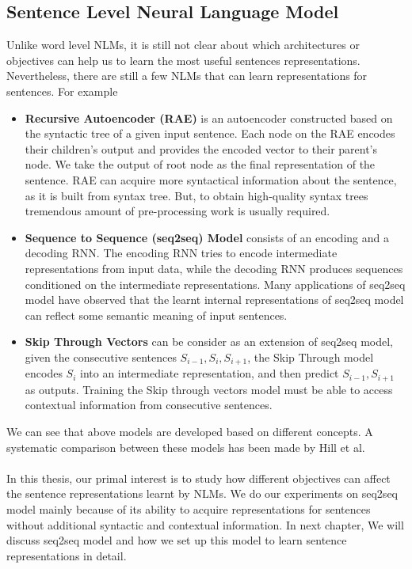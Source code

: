 	\subsection{Sentence Level Neural Language Model}
	Unlike word level NLMs, it is still not clear about which architectures or objectives can help us to learn the most useful sentences representations. 
	Nevertheless, there are still a few NLMs that can learn representations for sentences. For example
	\begin{itemize}
		\item \textbf{Recursive Autoencoder (RAE)}\cite{socher2011dynamic} is an autoencoder constructed based on the syntactic tree of a given input sentence. 
		Each node on the RAE encodes their children's output and provides the encoded vector to their parent's node. 
		We take the output of root node as the final representation of the sentence. 
		RAE can acquire more syntactical information about the sentence, as it is built from syntax tree. 
		But, to obtain high-quality syntax trees tremendous amount of pre-processing work is usually required.
		\item \textbf{Sequence to Sequence (seq2seq) Model}\cite{sutskever2014sequence,cho2014learning} consists of an encoding and a decoding RNN. The encoding RNN tries to encode intermediate representations from input data, while the decoding RNN produces sequences conditioned on the intermediate representations. Many applications of seq2seq model have observed that the learnt internal representations of seq2seq model can reflect some semantic meaning of input sentences.
		\item \textbf{Skip Through Vectors}\cite{kiros2015skip} can be consider as an extension of seq2seq model, given the consecutive sentences $S_{i-1}, S_{i}, S_{i+1}$, the Skip Through model encodes $S_{i}$ into an intermediate representation, and then predict $S_{i-1},S_{i+1}$ as outputs. 
		Training the Skip through vectors model must be able to access contextual information from consecutive sentences.
	\end{itemize}
	We can see that above models are developed based on different concepts. 
	A systematic comparison between these models has been made by Hill et al\cite{hill2016learning}. \\\\
	In this thesis, our primal interest is to study how different objectives can affect the sentence representations learnt by NLMs. 
	We do our experiments on seq2seq model mainly because of its ability to acquire representations for sentences without additional syntactic and contextual information. 
	In next chapter, We will discuss seq2seq model and how we set up this model to learn sentence representations in detail.
